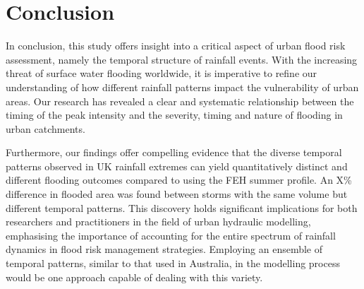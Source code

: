 \documentclass[APA,Times2COL]{WileyNJDv5}
\begin{document}

\section{Conclusion}\label{sec:conclusion}


In conclusion, this study offers insight into a critical aspect of urban flood risk assessment, namely the temporal structure of rainfall events. With the increasing threat of surface water flooding worldwide, it is imperative to refine our understanding of how different rainfall patterns impact the vulnerability of urban areas. Our research has revealed a clear and systematic relationship between the timing of the peak intensity and the severity, timing and nature of flooding in urban catchments. 

Furthermore, our findings offer compelling evidence that the diverse temporal patterns observed in UK rainfall extremes can yield quantitatively distinct and different flooding outcomes compared to using the FEH summer profile. An X\% difference in flooded area was found between storms with the same volume but different temporal patterns. This discovery holds significant implications for both researchers and practitioners in the field of urban hydraulic modelling, emphasising the importance of accounting for the entire spectrum of rainfall dynamics in flood risk management strategies. Employing an ensemble of temporal patterns, similar to that used in Australia, in the modelling process would be one approach capable of dealing with this variety. 
\end{document}
